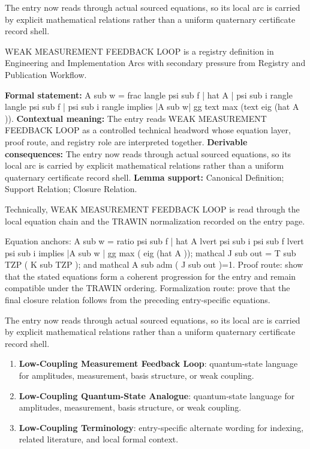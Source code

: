 The entry now reads through actual sourced equations, so its local arc is carried by explicit mathematical relations rather than a uniform quaternary certificate record shell.
\clearpage


\begingroup\small
{}
WEAK MEASUREMENT FEEDBACK LOOP is a registry definition in Engineering and Implementation Arcs with secondary pressure from Registry and Publication Workflow.

\begingroup\footnotesize\setlength{\emergencystretch}{3em}\sloppy
\textbf{Formal statement:} A sub w = frac langle psi sub f | hat A | psi sub i rangle langle psi sub f | psi sub i rangle implies |A sub w| gg text max (text eig (hat A )). \textbf{Contextual meaning:} The entry reads WEAK MEASUREMENT FEEDBACK LOOP as a controlled technical headword whose equation layer, proof route, and registry role are interpreted together. \textbf{Derivable consequences:} The entry now reads through actual sourced equations, so its local arc is carried by explicit mathematical relations rather than a uniform quaternary certificate record shell. \textbf{Lemma support:} Canonical Definition; Support Relation; Closure Relation.\par
\endgroup

Technically, WEAK MEASUREMENT FEEDBACK LOOP is read through the local equation chain and the TRAWIN normalization recorded on the entry page.

Equation anchors: A sub w = ratio psi sub f | hat A lvert psi sub i psi sub f lvert psi sub i implies |A sub w | gg max ( eig (hat A )); mathcal J sub out = T sub TZP ( K sub TZP ); and mathcal A sub adm ( J sub out )=1. Proof route: show that the stated equations form a coherent progression for the entry and remain compatible under the TRAWIN ordering. Formalization route: prove that the final closure relation follows from the preceding entry-specific equations.

The entry now reads through actual sourced equations, so its local arc is carried by explicit mathematical relations rather than a uniform quaternary certificate record shell.
\endgroup

\begin{enumerate}[leftmargin=1.6em,itemsep=6pt,topsep=4pt]
\item \textbf{Low-Coupling Measurement Feedback Loop}: quantum-state language for amplitudes, measurement, basis structure, or weak coupling.
\item \textbf{Low-Coupling Quantum-State Analogue}: quantum-state language for amplitudes, measurement, basis structure, or weak coupling.
\item \textbf{Low-Coupling Terminology}: entry-specific alternate wording for indexing, related literature, and local formal context.
\end{enumerate}

